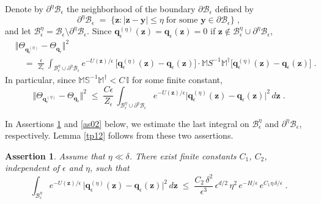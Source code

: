\documentclass[reqno]{amsart}
\newcounter{as}[section]
\newtheorem{asser}[as]{Assertion}
\newcommand{\mc}[1]{{\mathcal #1}}
\newcommand{\bb}[1]{{\mathbb #1}}
\newcommand{\bs}[1]{{\boldsymbol #1}}
\newcommand{\<}{\langle}
\renewcommand{\>}{\rangle}
\begin{document}
Denote by $\partial^{\eta}\mc{B}_{\epsilon} $ the neighborhood of the
boundary $\partial\mc{B}_{\epsilon}$ defined by
\begin{equation*}
\partial^{\eta}\mc{B}_{\epsilon}\;=\;
\big\{ \bs{z} : |\bs{z}-\bs{y}|\le\eta\;\mbox{for some }
\bs{y}\in\partial\mc{B}_{\epsilon}\big\}\;,
\end{equation*}
and let $\mc{B}_{\epsilon}^{\eta} = \mc{B}_{\epsilon}
\setminus \partial^{\eta} \mc{B}_{\epsilon}$.  Since
$\bs{q}_{\epsilon}^{(\eta)} (\bs{z}) = \bs{q}_{\epsilon}(\bs{z}) =0$
if $\bs{z}\notin\mc{B}_{\epsilon}^{\eta} \cup \partial^{\eta}
\mc{B}_{\epsilon}$,
\begin{align*}
& \big\Vert \Theta_{\bs{q}_{\epsilon}^{(\eta)}}
-\Theta_{\bs{q}_{\epsilon}}\big\Vert ^{2} \\
& \quad =\; \frac{\epsilon}{Z_{\epsilon}}\,
\int_{\mc{B}_{\epsilon}^{\eta}\cup\partial^{\eta}\mc{B}_{\epsilon}}
e^{-U(\bs{z})/\epsilon} \, \big[\bs{q}_{\epsilon}^{(\eta)}(\bs{z})-
\bs{q}_{\epsilon}(\bs{z})\big] \cdot \bb{MS}^{-1}\bb{M}^{\dagger}
\big[\bs{q}_{\epsilon}^{(\eta)}(\bs{z})-
\bs{q}_{\epsilon}(\bs{z})\big]\;.
\end{align*}
In particular, since $\bb{M} \bb{S}^{-1} \bb{M}^{\dagger} < C \, \bb{I}$ for
some finite constant,
\begin{equation*}
\big\Vert \Theta_{\bs{q}_{\epsilon}^{(\eta)}}
-\Theta_{\bs{q}_{\epsilon}}\big\Vert ^{2}
\;\le\; \frac{C \epsilon}{Z_{\epsilon}}\,
\int_{\mc{B}_{\epsilon}^{\eta}\cup\partial^{\eta}\mc{B}_{\epsilon}}e^{-U(\bs{z})/\epsilon}
\big |\bs{q}_{\epsilon}^{(\eta)}(\bs{z})-
\bs{q}_{\epsilon}(\bs{z})\big|^{2} \, d\bs{z}\;.
\end{equation*}

In Assertions \ref{as01} and \ref{as02} below, we estimate the last
integral on $\mc{B}_{\epsilon}^{\eta}$ and $\partial^{\eta}
\mc{B}_{\epsilon}$, respectively. Lemma \ref{tp12} follows from these
two assertions.

\begin{asser}
\label{as01}
Assume that $\eta\ll \delta$.  There exist finite constants $C_{1}$,
$C_{2}$, independent of $\epsilon$ and $\eta$, such that
\begin{equation*}
\int_{\mc{B}_{\epsilon}^{\eta}}
e^{-U(\bs{z})/\epsilon} \, \big|\bs{q}_{\epsilon}^{(\eta)}(\bs{z})
-\bs{q}_{\epsilon}(\bs{z})\big|^{2} \, d\bs{z}\;\le\;
\frac{C_2 \, \delta^{2}}{\epsilon^{3}}\, \epsilon^{d/2} \, \eta^{2}\,
e^{-H/\epsilon} \, e^{C_1 \eta\, \delta/\epsilon}\;.
\end{equation*}
\end{asser}
\end{document}
